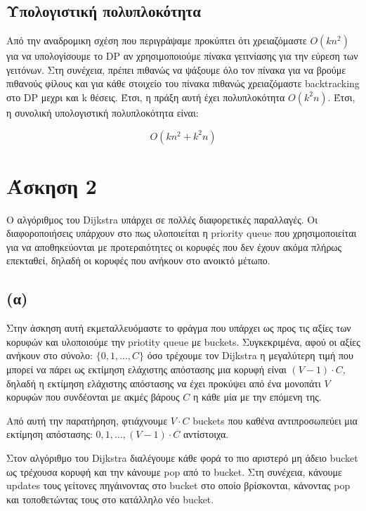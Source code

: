 \documentclass[a4paper,oneside, 11pt]{article}
\begin{document}
\subsection{Υπολογιστική πολυπλοκότητα}
Από την αναδρομικη σχέση που περιγράψαμε προκύπτει ότι χρειαζόμαστε $O(kn^2)$ για να υπολογίσουμε το DP αν χρησιμοποιούμε πίνακα γειτνίασης για την εύρεση των γειτόνων. Στη συνέχεια, πρέπει πιθανώς να ψάξουμε όλο τον πίνακα για να βρούμε πιθανούς φίλους και για κάθε στοιχείο του πίνακα πιθανώς χρειαζόμαστε backtracking στο DP μεχρι και k θέσεις. Έτσι, η πράξη αυτή έχει πολυπλοκότητα $O(k^2n)$. Έτσι, η συνολική υπολογιστική πολυπλοκότητα είναι:

$$
O(kn^2 + k^2n)
$$




\section{Άσκηση 2}
Ο αλγόριθμος του Dijkstra υπάρχει σε πολλές διαφορετικές παραλλαγές. Οι διαφοροποιήσεις υπάρχουν στο πως υλοποιείται η priority queue που χρησιμοποιείται για να αποθηκεύονται με προτεραιότητες οι κορυφές που δεν έχουν ακόμα πλήρως επεκταθεί, δηλαδή οι κορυφές που ανήκουν στο ανοικτό μέτωπο.
\subsection{(α)}
Στην άσκηση αυτή εκμεταλλευόμαστε το φράγμα που υπάρχει ως προς τις αξίες των κορυφών και υλοποιούμε την priotity queue με buckets. Συγκεκριμένα, αφού οι αξίες ανήκουν στο σύνολο: $\{0, 1, ..., C\}$ όσο τρέχουμε τον Dijkstra η μεγαλύτερη τιμή που μπορεί να πάρει ως εκτίμηση ελάχιστης απόστασης μια κορυφή είναι $(V-1)\cdot C$, δηλαδή η εκτίμηση ελάχιστης απόστασης να έχει προκύψει από ένα μονοπάτι $V$ κορυφών που συνδέονται με ακμές βάρους $C$ η κάθε μία με την επόμενη της. \bigbreak 

Από αυτή την παρατήρηση, φτιάχνουμε $V\cdot C$ buckets που καθένα αντιπροσωπεύει μια εκτίμηση απόστασης: $0, 1, ..., (V-1)\cdot C$ αντίστοιχα. \bigbreak 

Στον αλγόριθμο του Dijkstra διαλέγουμε κάθε φορά το πιο αριστερό μη άδειο bucket ως τρέχουσα κορυφή και την κάνουμε pop από το bucket. Στη συνέχεια, κάνουμε updates τους γείτονες πηγάινοντας στο bucket στο οποίο βρίσκονται, κάνοντας pop και τοποθετώντας τους στο κατάλληλο νέο bucket. \bigbreak 
\end{document}
